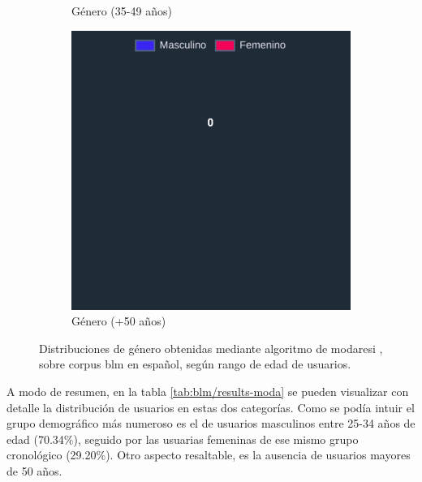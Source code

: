 \begin{figure}[H]
\begin{subfigure}{0.3\textwidth}
  \caption{Género (35-49 años)}
  \end{subfigure}
  \begin{subfigure}{0.3\textwidth}
   \includegraphics[width=\textwidth]{imaxes/capturas-app/graficos/modaresi/grafico-genero-vv.png}
  \caption{Género (+50 años)}
  \end{subfigure}
  \caption{Distribuciones de género obtenidas mediante algoritmo de modaresi \cite{modaresi:2016}, sobre corpus \acrshort{blm} en español, según rango de edad de usuarios.}
  \label{fig:blm/resultados-genero-moda}
\end{figure}

A modo de resumen, en la tabla \ref{tab:blm/results-moda} se pueden visualizar con detalle la distribución de usuarios en estas dos categorías. Como se podía intuir el grupo demográfico más numeroso es el de usuarios masculinos entre 25-34 años de edad (70.34\%), seguido por las usuarias femeninas de ese mismo grupo cronológico (29.20\%). Otro aspecto resaltable, es la ausencia de usuarios mayores de 50 años.

